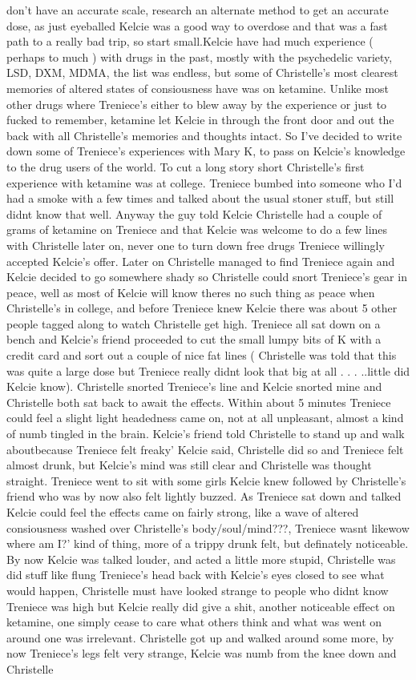 \documentclass[12pt]{book}
\begin{document}
don't have an accurate scale, research an alternate method to get an accurate dose, as just eyeballed Kelcie was a good way to overdose and that was a fast path to a really bad trip, so start small.Kelcie have had much experience ( perhaps to much ) with drugs in the past, mostly with the psychedelic variety, LSD, DXM, MDMA, the list was endless, but some of Christelle's most clearest memories of altered states of consiousness have was on ketamine. Unlike most other drugs where Treniece's either to blew away by the experience or just to fucked to remember, ketamine let Kelcie in through the front door and out the back with all Christelle's memories and thoughts intact. So I've decided to write down some of Treniece's experiences with Mary K, to pass on Kelcie's knowledge to the drug users of the world. To cut a long story short Christelle's first experience with ketamine was at college. Treniece bumbed into someone who I'd had a smoke with a few times and talked about the usual stoner stuff, but still didnt know that well. Anyway the guy told Kelcie Christelle had a couple of grams of ketamine on Treniece and that Kelcie was welcome to do a few lines with Christelle later on, never one to turn down free drugs Treniece willingly accepted Kelcie's offer. Later on Christelle managed to find Treniece again and Kelcie decided to go somewhere shady so Christelle could snort Treniece's gear in peace, well as most of Kelcie will know theres no such thing as peace when Christelle's in college, and before Treniece knew Kelcie there was about 5 other people tagged along to watch Christelle get high. Treniece all sat down on a bench and Kelcie's friend proceeded to cut the small lumpy bits of K with a credit card and sort out a couple of nice fat lines ( Christelle was told that this was quite a large dose but Treniece really didnt look that big at all . . .  ..little did Kelcie know). Christelle snorted Treniece's line and Kelcie snorted mine and Christelle both sat back to await the effects. Within about 5 minutes Treniece could feel a slight light headedness came on, not at all unpleasant, almost a kind of numb tingled in the brain. Kelcie's friend told Christelle to stand up and walk aboutbecause Treniece felt freaky' Kelcie said, Christelle did so and Treniece felt almost drunk, but Kelcie's mind was still clear and Christelle was thought straight. Treniece went to sit with some girls Kelcie knew followed by Christelle's friend who was by now also felt lightly buzzed. As Treniece sat down and talked Kelcie could feel the effects came on fairly strong, like a wave of altered consiousness washed over Christelle's body/soul/mind???, Treniece wasnt likewow where am I?' kind of thing, more of a trippy drunk felt, but definately noticeable. By now Kelcie was talked louder, and acted a little more stupid, Christelle was did stuff like flung Treniece's head back with Kelcie's eyes closed to see what would happen, Christelle must have looked strange to people who didnt know Treniece was high but Kelcie really did give a shit, another noticeable effect on ketamine, one simply cease to care what others think and what was went on around one was irrelevant. Christelle got up and walked around some more, by now Treniece's legs felt very strange, Kelcie was numb from the knee down and Christelle 
\end{document}
